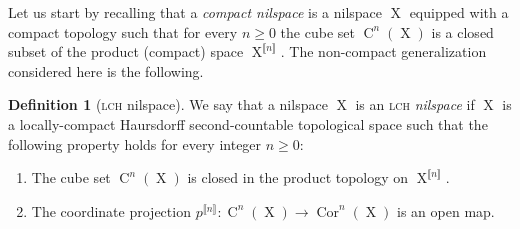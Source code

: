 \documentclass[a4paper,12pt,reqno]{amsart}
\theoremstyle{definition}
\newtheorem{defn}[theorem]{Definition}
\def\to{\rightarrow}
\newcommand*{\db}[1]{\llbracket #1\rrbracket}
\DeclareMathOperator{\ns}{X}
\DeclareMathOperator{\cu}{C}
\DeclareMathOperator{\cor}{Cor}
\begin{document}
Let us start by recalling that a \emph{compact nilspace} is a nilspace $\ns$ equipped with a compact topology such that for every $n\ge 0$ the cube set $\cu^n(\ns)$ is a closed subset of the product (compact) space $\ns^{\db{n}}$. The non-compact generalization considered here is the following.
\begin{defn}[\textsc{lch} nilspace]\label{def:top-nil-open-maps-version}
We say that a nilspace $\ns$ is an \textsc{lch}\emph{ nilspace} if $\ns$ is a locally-compact Haursdorff second-countable topological space such that the following property holds for every integer $n\geq 0$:
\begin{enumerate}
    \item The cube set $\cu^n(\ns)$ is closed in the product topology on $\ns^{\db{n}}$.
    \item The coordinate projection $p^{\db{n}}:\cu^n(\ns)\to \cor^n(\ns)$ is an open map.
\end{enumerate}
\end{defn}
\end{document}
